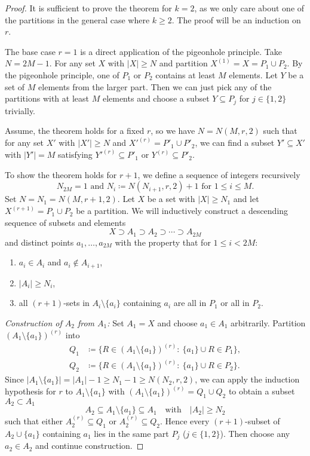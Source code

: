 \begin{proof}

    It is sufficient to prove the theorem for $k=2$, as we only care about one of the partitions in the general case where $k \geq 2$. The proof will be an induction on $r$.

    The base case $r=1$ is a direct application of the pigeonhole principle. Take $N = 2M-1$. For any set $X$ with $|X| \geq N$ and partition $X^{(1)} = X = P_1 \cup P_2$. By the pigeonhole principle, one of $P_1$ or $P_2$ contains at least $M$ elements. Let $Y$ be a set of $M$ elements from the larger part. Then we can just pick any of the partitions with at least $M$ elements and choose a subset $Y \subseteq P_j$ for $j \in \{1, 2\}$ trivially.

    Assume, the theorem holds for a fixed $r$, so we have $N = N(M, r, 2)$ such that for any set $X'$ with $|X'| \geq N$ and $X'^{(r)} = P'_1 \cup P'_2$, we can find a subset $Y' \subseteq X'$ with $|Y'| = M$ satisfying $Y'^{(r)} \subseteq P'_1$ or $Y^{(r)} \subseteq P'_2$.

    To show the theorem holds for $r+1$, we define a sequence of integers recursively
    \[
        N_{2M} = 1 \text{ and } N_{i} \coloneq N(N_{i+1}, r, 2) + 1 \text{ for } 1 \leq i \leq M.
    \]
    Set $N = N_{1} = N(M, r+1, 2)$. Let $X$ be a set with $|X| \geq N_{1}$ and let $X^{(r+1)} = P_1 \cup P_2$ be a partition. We will inductively construct a descending sequence of subsets and elements
    \[
        X \supset A_1 \supset A_2 \supset \cdots \supset A_{2M}
    \]
    and distinct points $a_1,\dots,a_{2M}$ with the property that for $1 \le i < 2M$:
    \begin{enumerate}
        \item $a_i \in A_i$ and $a_i \notin A_{i+1}$,
        \item $|A_i| \ge N_i$,
        \item all $(r+1)$-sets in $A_i \setminus\{a_i\}$ containing $a_i$ are all in $P_1$ or all in $P_2$.{\label{enum-item:clause-4}}
    \end{enumerate}


    \textit{Construction of $A_2$ from $A_1$: }Set $A_1=X$ and choose $a_1\in A_1$ arbitrarily. Partition $(A_1\setminus\{a_1\})^{(r)}$ into
    \[
        \begin{aligned}
            Q_1 &\coloneq \{R\in (A_1\setminus\{a_1\})^{(r)}:\ \{a_1\}\cup R\in P_1\},\\
            Q_2 &\coloneq \{R\in (A_1\setminus\{a_1\})^{(r)}:\ \{a_1\}\cup R\in P_2\}.
        \end{aligned}
    \]
    Since $|A_1\setminus\{a_1\}|=|A_1|-1\ge N_1-1\ge N(N_2,r,2)$, we can apply the induction hypothesis for $r$ to $A_1\setminus\{a_1\}$ with $(A_1\setminus\{a_1\})^{(r)}=Q_1\cup Q_2$ to obtain a subset $A_2 \subset A_1$
    \[
        A_2\subseteq A_1\setminus\{a_1\} \subseteq A_1 \quad\text{with}\quad |A_2|\ge N_2
    \]
    such that either $A_2^{(r)}\subseteq Q_1$ or $A_2^{(r)}\subseteq Q_2$. Hence every $(r+1)$-subset of $A_2\cup\{a_1\}$ containing $a_1$ lies in the same part $P_j$ ($j\in\{1,2\}$). Then choose any $a_2\in A_2$ and continue construction.


\end{proof}
